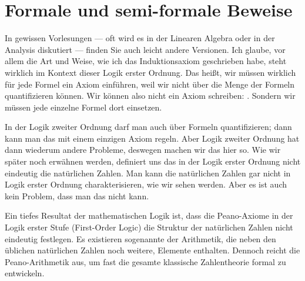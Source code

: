 \section{Formale und semi-formale Beweise}

\begin{spoken-clean}[00:13:28 - 00:14:48]
In gewissen Vorlesungen --- oft wird es in der Linearen Algebra oder in der Analysis diskutiert --- finden Sie auch leicht andere Versionen. Ich glaube, vor allem die Art und Weise, wie ich das Induktionsaxiom geschrieben habe, steht wirklich im Kontext dieser Logik erster Ordnung. Das heißt, wir müssen wirklich für jede Formel ein Axiom einführen, weil wir nicht über die Menge der Formeln quantifizieren können. Wir können also nicht ein Axiom schreiben: . Sondern wir müssen jede einzelne Formel dort einsetzen.

In der Logik zweiter Ordnung darf man auch über Formeln quantifizieren; dann kann man das mit einem einzigen Axiom regeln. Aber Logik zweiter Ordnung hat dann wiederum andere Probleme, deswegen machen wir das hier so. Wie wir später noch erwähnen werden, definiert uns das in der Logik erster Ordnung nicht eindeutig die natürlichen Zahlen. Man kann die natürlichen Zahlen gar nicht in Logik erster Ordnung charakterisieren, wie wir sehen werden. Aber es ist auch kein Problem, dass man das nicht kann.
\end{spoken-clean}

\begin{didactic-insight}
Ein tiefes Resultat der mathematischen Logik ist, dass die Peano-Axiome in der Logik erster Stufe (First-Order Logic) die Struktur der natürlichen Zahlen nicht eindeutig festlegen. Es existieren sogenannte  der Arithmetik, die neben den üblichen natürlichen Zahlen noch weitere,  Elemente enthalten. Dennoch reicht die Peano-Arithmetik aus, um fast die gesamte klassische Zahlentheorie formal zu entwickeln.
\end{didactic-insight}

